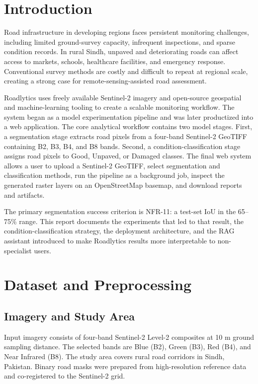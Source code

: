 ﻿\documentclass[conference]{IEEEtran}
\begin{document}
\section{Introduction}
Road infrastructure in developing regions faces persistent monitoring challenges, including limited ground-survey capacity, infrequent inspections, and sparse condition records. In rural Sindh, unpaved and deteriorating roads can affect access to markets, schools, healthcare facilities, and emergency response. Conventional survey methods are costly and difficult to repeat at regional scale, creating a strong case for remote-sensing-assisted road assessment.

Roadlytics uses freely available Sentinel-2 imagery and open-source geospatial and machine-learning tooling to create a scalable monitoring workflow. The system began as a model experimentation pipeline and was later productized into a web application. The core analytical workflow contains two model stages. First, a segmentation stage extracts road pixels from a four-band Sentinel-2 GeoTIFF containing B2, B3, B4, and B8 bands. Second, a condition-classification stage assigns road pixels to Good, Unpaved, or Damaged classes. The final web system allows a user to upload a Sentinel-2 GeoTIFF, select segmentation and classification methods, run the pipeline as a background job, inspect the generated raster layers on an OpenStreetMap basemap, and download reports and artifacts.

The primary segmentation success criterion is NFR-11: a test-set IoU in the 65--75\% range. This report documents the experiments that led to that result, the condition-classification strategy, the deployment architecture, and the RAG assistant introduced to make Roadlytics results more interpretable to non-specialist users.

\section{Dataset and Preprocessing}
\subsection{Imagery and Study Area}
Input imagery consists of four-band Sentinel-2 Level-2 composites at 10 m ground sampling distance. The selected bands are Blue (B2), Green (B3), Red (B4), and Near Infrared (B8). The study area covers rural road corridors in Sindh, Pakistan. Binary road masks were prepared from high-resolution reference data and co-registered to the Sentinel-2 grid.
\end{document}
